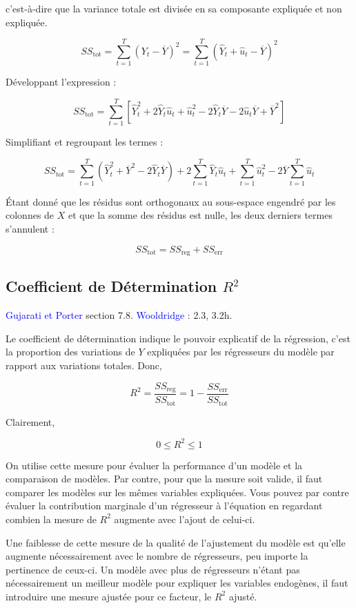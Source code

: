 \documentclass[14pt]{extarticle} %
\theoremstyle{definition}
\theoremstyle{plain}
\newcommand{\livre}[1]{\textcolor{blue}{#1}}
\begin{document}
c’est-à-dire que la variance totale est divisée en sa composante expliquée et non expliquée.

\[
SS_{\text{tot}} = \sum_{t=1}^{T} (Y_t - \overline{Y})^2 = \sum_{t=1}^{T} (\hat{Y}_t + \hat{u}_t - \overline{Y})^2
\]

Développant l’expression :

\[
SS_{\text{tot}} = \sum_{t=1}^{T} \left[\hat{Y}_t^2 + 2\hat{Y}_t \hat{u}_t + \hat{u}_t^2 - 2\hat{Y}_t \overline{Y} - 2\hat{u}_t \overline{Y} + \overline{Y}^2\right]
\]

Simplifiant et regroupant les termes :

\[
SS_{\text{tot}} = \sum_{t=1}^{T} \left(\hat{Y}_t^2 + \overline{Y}^2 - 2\hat{Y}_t \overline{Y}\right) + 2 \sum_{t=1}^{T} \hat{Y}_t \hat{u}_t + \sum_{t=1}^{T} \hat{u}_t^2 - 2\overline{Y} \sum_{t=1}^{T} \hat{u}_t
\]

Étant donné que les résidus sont orthogonaux au sous-espace engendré par les colonnes de $X$ et que la somme des résidus est nulle, les deux derniers termes s’annulent :

\[
SS_{\text{tot}} = SS_{\text{reg}} + SS_{\text{err}}
\]

\subsection{Coefficient de Détermination $R^2$}

\livre{Gujarati et Porter} section 7.8. \livre{Wooldridge} : 2.3, 3.2h.

Le coefficient de détermination indique le pouvoir explicatif de la régression, c’est la proportion des variations de $Y$ expliquées par les régresseurs du modèle par rapport aux variations totales. Donc,

\[
R^2 = \frac{SS_{\text{reg}}}{SS_{\text{tot}}} = 1 - \frac{SS_{\text{err}}}{SS_{\text{tot}}}
\]

Clairement,

\[
0 \leq R^2 \leq 1
\]

On utilise cette mesure pour évaluer la performance d’un modèle et la comparaison de modèles. Par contre, pour que la mesure soit valide, il faut comparer les modèles sur les mêmes variables expliquées. Vous pouvez par contre évaluer la contribution marginale d’un régresseur à l’équation en regardant combien la mesure de $R^2$ augmente avec l’ajout de celui-ci.

Une faiblesse de cette mesure de la qualité de l’ajustement du modèle est qu’elle augmente nécessairement avec le nombre de régresseurs, peu importe la pertinence de ceux-ci. Un modèle avec plus de régresseurs n’étant pas nécessairement un meilleur modèle pour expliquer les variables endogènes, il faut introduire une mesure ajustée pour ce facteur, le $R^2$ ajusté.
\end{document}
